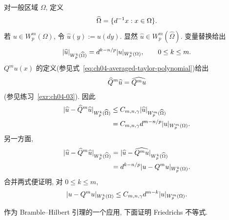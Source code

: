 \begin{Proof}
对一般区域 $\Omega$, 定义
\begin{equation}
\MathBookFormulaID{formula-ch04-scaled-domain}
\label{eq:ch04-scaled-domain}
\widehat\Omega=\{d^{-1}x:x\in\Omega\}.
\end{equation}
若 $u\in W_p^m(\Omega)$, 令 $\widehat u(y):=u(dy)$. 显然 $\widehat u\in W_p^m(\widehat\Omega)$. 变量替换给出
\begin{equation}
\MathBookFormulaID{formula-ch04-scaled-sobolev-seminorm}
\label{eq:ch04-scaled-sobolev-seminorm}
|\widehat u|_{W_p^k(\widehat\Omega)}
=d^{k-n/p}|u|_{W_p^k(\Omega)},\qquad0\leq k\leq m.
\end{equation}
$Q^m u(x)$ 的定义(参见式~\eqref{eq:ch04-averaged-taylor-polynomial})给出
\begin{equation}
\MathBookFormulaID{formula-ch04-scaled-averaged-taylor-polynomial}
\label{eq:ch04-scaled-averaged-taylor-polynomial}
\widehat Q^m\widehat u=\widehat{Q^m u}
\end{equation}
(参见练习~\ref{exr:ch04-03}). 因此
\[
\MathBookFormulaID{formula-ch04-bramble-hilbert-scaling-proof}
\begin{aligned}
|\widehat u-\widehat Q^m\widehat u|_{W_p^k(\widehat\Omega)}
&\leq C_{m,n,\gamma}|\widehat u|_{W_p^m(\widehat\Omega)}\\
&=C_{m,n,\gamma}d^{m-n/p}|u|_{W_p^m(\Omega)}.
\end{aligned}
\]
另一方面,
\[
\MathBookFormulaID{formula-ch04-bramble-hilbert-scaling-left}
\begin{aligned}
|\widehat u-\widehat Q^m\widehat u|_{W_p^k(\widehat\Omega)}
&=|\widehat u-\widehat{Q^m u}|_{W_p^k(\widehat\Omega)}\\
&=d^{k-n/p}|u-Q^m u|_{W_p^k(\Omega)}.
\end{aligned}
\]
合并两式便证明, 对 $0\leq k\leq m$,
\[
\MathBookFormulaID{formula-ch04-bramble-hilbert-final}
|u-Q^m u|_{W_p^k(\Omega)}
\leq C_{m,n,\gamma}d^{m-k}|u|_{W_p^m(\Omega)}.
\]
\end{Proof}

作为 Bramble--Hilbert 引理的一个应用, 下面证明 Friedrichs 不等式.

